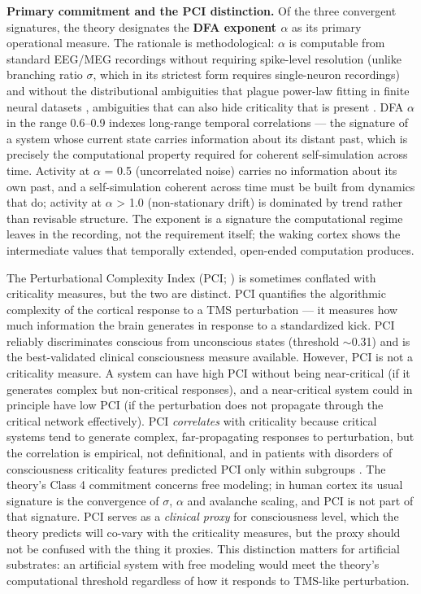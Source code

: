 \documentclass[12pt]{article}
\newcommand{\revstart}{}
\newcommand{\revend}{}
\begin{document}
{\revstart\textbf{Primary commitment and the PCI distinction.} Of the three convergent signatures, the theory designates the \textbf{DFA exponent $\alpha$} as its primary operational measure. The rationale is methodological: $\alpha$ is computable from standard EEG/MEG recordings without requiring spike-level resolution (unlike branching ratio $\sigma$, which in its strictest form requires single-neuron recordings) and without the distributional ambiguities that plague power-law fitting in finite neural datasets \citep{ClausetShaliziNewman2009}, ambiguities that can also hide criticality that is present \citep{Fontenele2026}. DFA $\alpha$ in the range 0.6--0.9 indexes long-range temporal correlations --- the signature of a system whose current state carries information about its distant past, which is precisely the computational property required for coherent self-simulation across time. Activity at $\alpha$ = 0.5 (uncorrelated noise) carries no information about its own past, and a self-simulation coherent across time must be built from dynamics that do; activity at $\alpha$ > 1.0 (non-stationary drift) is dominated by trend rather than revisable structure. The exponent is a signature the computational regime leaves in the recording, not the requirement itself; the waking cortex shows the intermediate values that temporally extended, open-ended computation produces.

The Perturbational Complexity Index (PCI; \citealp{Casali2013}) is sometimes conflated with criticality measures, but the two are distinct. PCI quantifies the algorithmic complexity of the cortical response to a TMS perturbation --- it measures how much information the brain generates in response to a standardized kick. PCI reliably discriminates conscious from unconscious states (threshold $\sim$0.31) and is the best-validated clinical consciousness measure available. However, PCI is not a criticality measure. A system can have high PCI without being near-critical (if it generates complex but non-critical responses), and a near-critical system could in principle have low PCI (if the perturbation does not propagate through the critical network effectively). PCI \emph{correlates} with criticality because critical systems tend to generate complex, far-propagating responses to perturbation, but the correlation is empirical, not definitional, and in patients with disorders of consciousness criticality features predicted PCI only within subgroups \citep{Newman2026}. The theory's Class 4 commitment concerns free modeling; in human cortex its usual signature is the convergence of $\sigma$, $\alpha$ and avalanche scaling, and PCI is not part of that signature. PCI serves as a \emph{clinical proxy} for consciousness level, which the theory predicts will co-vary with the criticality measures, but the proxy should not be confused with the thing it proxies. This distinction matters for artificial substrates: an artificial system with free modeling would meet the theory's computational threshold regardless of how it responds to TMS-like perturbation.\revend}
\end{document}
